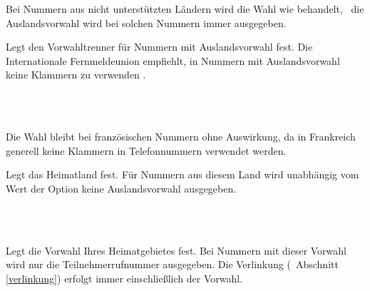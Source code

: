 \documentclass[numbers=noenddot]{scrreprt}
\newcommand*\vglAbschnitt[1]{(\cf\ Abschnitt \ref{#1})}
\begin{document}
\begin{Befehlsliste}
Bei Nummern aus nicht unterstützten Ländern wird die Wahl
wie
 behandelt, \ie\ die Auslandsvorwahl wird bei solchen Nummern immer ausgegeben.

Legt den Vorwahltrenner für Nummern mit Auslandsvorwahl fest. Die Internationale Fernmeldeunion empfiehlt, in Nummern mit Auslandsvorwahl keine Klammern zu verwenden \cite[3]{ITU-123}.

\begin{sidebyside}
   \\
   \\
\end{sidebyside}
Die Wahl
bleibt bei französischen Nummern ohne Auswirkung, da in Frankreich generell keine Klammern in Telefonnummern verwendet werden.

Legt das Heimatland fest. Für Nummern aus diesem Land wird unabhängig vom Wert der Option  keine Auslandsvorwahl ausgegeben.
\begin{sidebyside}
   \\
   \\
\end{sidebyside}

Legt die Vorwahl Ihres Heimatgebietes fest. Bei Nummern mit dieser Vorwahl wird nur die Teilnehmerrufnummer ausgegeben. Die Verlinkung
\vglAbschnitt{verlinkung}
erfolgt immer einschließlich der Vorwahl.


\end{Befehlsliste}
\end{document}
